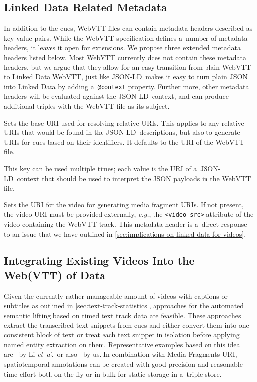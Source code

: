 \documentclass{sig-alternate-ceur}
\def\JSONLD{\mbox{JSON-LD}}
\begin{document}
\subsection{Linked Data Related Metadata}

In addition to the cues, WebVTT files can contain
metadata headers described as key-value pairs.
While the WebVTT specification defines a~number of metadata headers,
it leaves it open for extensions.
We propose three extended metadata headers listed below.
Most WebVTT currently does not contain
these metadata headers,
but we argue that they allow for an easy transition
from plain WebVTT to Linked Data WebVTT,
just like \JSONLD\ makes it easy to turn plain JSON into Linked Data
by adding a~\texttt{@context} property.
Further more, other metadata headers will be evaluated
against the \JSONLD\ context,
and can produce additional triples with the WebVTT file as its subject.

\begin{description}[leftmargin=*]
  \item[@base]
  Sets the base URI used for resolving relative URIs.
  This applies to any relative URIs that would be found in the \JSONLD\ descriptions,
  but also to generate URIs for cues based on their identifiers.
  It defaults to the URI of the WebVTT file.
  \item[@context]
  This key can be used multiple times; each value is the URI
  of a~\JSONLD\ context that should be used to
  interpret the JSON payloads in the WebVTT file.
  \item[@video]
  Sets the URI for the video for generating media fragment URIs.
  If not present, the video URI must be provided externally,
  \emph{e.g.}, the \texttt{<video src>} attribute of the video
  containing the WebVTT track.
  This metadata header is a~direct response to an issue that we
  have outlined in \autoref{sec:implications-on-linked-data-for-videos}.
\end{description}

\subsection{Integrating Existing Videos Into the\\ Web(VTT) of Data}
\label{sec:integrating-existing-videos-into-the-web(vtt)-of-data}

Given the currently rather manageable amount of videos
with captions or subtitles as outlined in \autoref{sec:text-track-statistics},
approaches for the automated semantic lifting
based on timed text track data are feasible. 
These approaches extract the transcribed text snippets from cues
and either convert them into one consistent block of text
or treat each text snippet in isolation
before applying named entity extraction on them.
Representative examples based on this idea
are~\cite{li2013enriching,li2012creating,yi2012synote}
by Li \emph{et~al.}\ or also~\cite{steiner2010semwebvid} by us.
In combination with Media Fragments URI, spatiotemporal annotations
can be created with good precision and reasonable time effort
both on-the-fly or in bulk for static storage in a~triple store.
\end{document}
